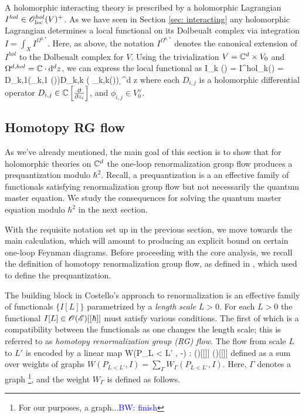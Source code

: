 \documentclass[10pt]{article}
\def\brian{\textcolor{blue}{BW: }\textcolor{blue}}
\begin{document}
A holomorphic interacting theory is prescribed by a holomorphic Lagrangian $I^{hol} \in \mathscr O_{\rm loc}^{hol}(V)^+$. 
As we have seen in Section \ref{sec: interacting} any holomorphic Lagrangian determines a local functional on its Dolbeualt complex via integration $I = \int_X I^{\Omega^{0,*}}$. 
Here, as above, the notation $I^{\Omega^{0,*}}$ denotes the canonical extension of $I^{hol}$ to the Dolbeualt complex for $V$. 
Using the trivialization $V = \mathbb C^d \times V_0$ and $\Omega^{d,hol} = \mathbb C \cdot {\rm d}^d z$, we can express the local functional as
\ben
I_k (\alpha) = \int I^{hol}_k(\alpha) = \int D_{k,1}(\phi_{k,1} (\alpha))\cdots D_{k,k} ( \phi_{k,k}(\alpha)) \d^d z 
\een
where each $D_{i,j}$ is a holomorphic differential operator $D_{i,j} \in \mathbb C\left[\frac{\partial}{\partial z_i}\right]$, and $\phi_{i,j} \in V_0^\vee$.

\subsection{Homotopy RG flow}

As we've already mentioned, the main goal of this section is to show that for holomorphic theories on $\mathbb C^d$ the one-loop renormalization group flow produces a prequantization modulo $\hbar^2$. 
Recall, a prequantization is a an effective family of functionals satisfying renormalization group flow but not necessarily the quantum master equation. We study the consequences for solving the quantum master equation modulo $\hbar^2$ in the next section.  

With the requisite notation set up in the previous section, we move towards the main calculation, which will amount to producing an explicit bound on certain one-loop Feynman diagrams. 
Before proceeding with the core analysis, we recall the definition of homotopy renormalization group flow, as defined in \cite{CosRenorm}, which used to define the prequantization.

The building block in Costello's approach to renormalization is an effective family of functionals $\{I[L]\}$ parametrized by a {\em length scale} $L > 0$. 
For each $L > 0$ the functional $I[L] \in \mathscr O(\mathscr E)[[\hbar]]$ must satisfy various conditions. 
The first of which is a compatibility between the functionals as one changes the length scale; this is referred to as {\em homotopy renormalization group (RG) flow}.
The flow from scale $L$ to $L'$ is encoded by a linear map
\ben
W(P_{L < L'} , -) : \sO(\sE)[[\hbar]] \to \sO(\sE)[[\hbar]]
\een
defined as a sum over weights of graphs $W (P_{L<L'}, I) = \sum_{\Gamma} W_{\Gamma}(P_{L<L'}, I)$. 
Here, $\Gamma$ denotes a graph \footnote{For our purposes, a graph...\brian{finish}}, and the weight $W_\Gamma$ is defined as follows.
\end{document}

